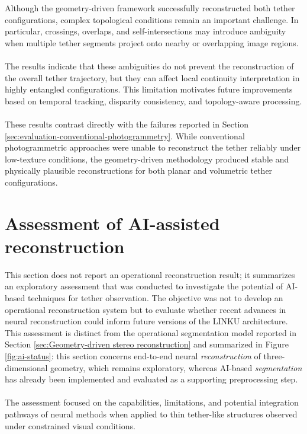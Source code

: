 Although the geometry-driven framework successfully reconstructed both tether configurations, complex topological conditions remain an important challenge. In particular, crossings, overlaps, and self-intersections may introduce ambiguity when multiple tether segments project onto nearby or overlapping image regions.
\\\\
The results indicate that these ambiguities do not prevent the reconstruction of the overall tether trajectory, but they can affect local continuity interpretation in highly entangled configurations. This limitation motivates future improvements based on temporal tracking, disparity consistency, and topology-aware processing.
\\\\
These results contrast directly with the failures reported in Section \ref{sec:evaluation-conventional-photogrammetry}. While conventional photogrammetric approaches were unable to reconstruct the tether reliably under low-texture conditions, the geometry-driven methodology produced stable and physically plausible reconstructions for both planar and volumetric tether configurations.

\section{Assessment of AI-assisted reconstruction}

This section does not report an operational reconstruction result; it summarizes an exploratory assessment that was conducted to investigate the potential of AI-based techniques for tether observation. The objective was not to develop an operational reconstruction system but to evaluate whether recent advances in neural reconstruction could inform future versions of the LINKU architecture. This assessment is distinct from the operational segmentation model reported in Section \ref{sec:Geometry-driven stereo reconstruction} and summarized in Figure \ref{fig:ai-status}: this section concerns end-to-end neural \emph{reconstruction} of three-dimensional geometry, which remains exploratory, whereas AI-based \emph{segmentation} has already been implemented and evaluated as a supporting preprocessing step.
\\\\
The assessment focused on the capabilities, limitations, and potential integration pathways of neural methods when applied to thin tether-like structures observed under constrained visual conditions.

